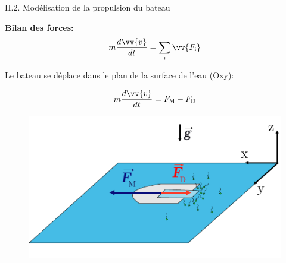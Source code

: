 \documentclass[aspectratio=169,10pt]{beamer}
\begin{document}
\begin{frame}{II.2. Modélisation de la propulsion du bateau}
    \begin{minipage}{6cm}
        \textbf{Bilan des forces:}\bigskip
        \begin{equation}
            m\frac{d\vv{v}}{dt} = \sum_i \vv{F_{\rm i}}\nonumber
        \end{equation}

        Le bateau se déplace dans le plan de la surface de l'eau (Oxy): 

        \begin{equation}
            m\frac{d\vv{v}}{dt} = F_{\rm M} - F_{\rm D}
        \end{equation}

    \end{minipage}
    \begin{minipage}{7cm}  
        \begin{figure}
            \centering
            \includegraphics[scale=1]{./figures/SchemaModeleBateau.pdf}
        \end{figure}
    \end{minipage}
\end{frame}
\end{document}
